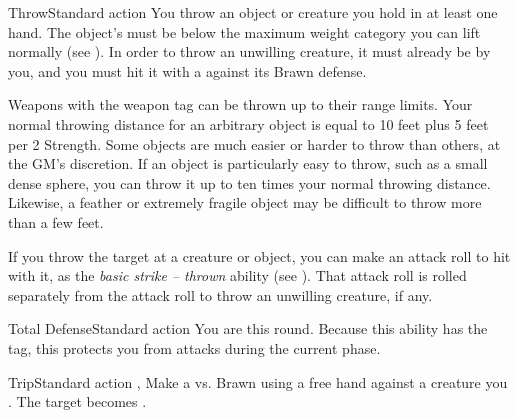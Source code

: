   \begin{activeability}{Throw}{Standard action}
    \abilitytags {}
    \rankline
    You throw an object or creature you hold in at least one hand.
    The object's  must be below the maximum weight category you can lift normally (see ).
    In order to throw an unwilling creature, it must already be \grappled by you, and you must hit it with a  against its Brawn defense.

    Weapons with the  weapon tag can be thrown up to their range limits.
    Your normal throwing distance for an arbitrary object is equal to 10 feet plus 5 feet per 2 Strength.
    Some objects are much easier or harder to throw than others, at the GM's discretion.
    If an object is particularly easy to throw, such as a small dense sphere, you can throw it up to ten times your normal throwing distance.
    Likewise, a feather or extremely fragile object may be difficult to throw more than a few feet.

    If you throw the target at a creature or object, you can make an attack roll to hit with it, as the \textit{basic strike -- thrown} ability (see ).
    That attack roll is rolled separately from the attack roll to throw an unwilling creature, if any.
  \end{activeability}

  \begin{activeability}{Total Defense}{Standard action}
    \abilitytags {}
    \rankline
    You are \braced this round.
    Because this ability has the  tag, this protects you from attacks during the current phase.
  \end{activeability}

  \begin{activeability}{Trip}{Standard action}
    \abilitytags {}, 
    \rankline
    Make a  vs. Brawn using a free hand against a creature you .
    \hit The target becomes \prone.
  \end{activeability}


